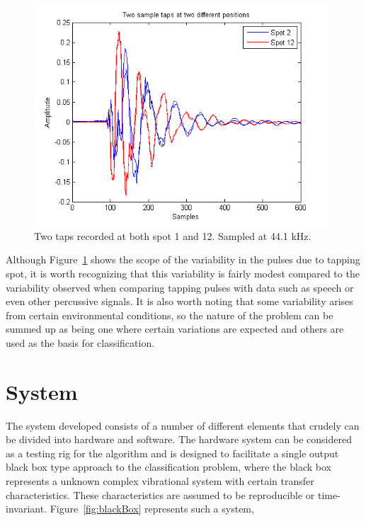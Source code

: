 \begin{figure}[!htbp]
  \begin{center}
    \includegraphics[width=110mm]{twotwoSampleTap}
    \caption{Two taps recorded at both spot 1 and 12. Sampled at 44.1 kHz.}\label{fig:twotwoSampleTap}
  \end{center}
\end{figure}


Although Figure~\ref{fig:twotwoSampleTap} shows the scope of the variability in the pulses due to tapping spot, it is worth recognizing that this variability is fairly modest compared to the variability observed when comparing tapping pulses with data such as speech or even other percussive signals. It is also worth noting that some variability arises from certain environmental conditions, so the nature of the problem can be summed up as being one where certain variations are expected and others are used as the basis for classification.

\section{System}\label{sec:APRsystem}
The system developed consists of a number of different elements that crudely can be divided into hardware and software. The hardware system can be considered as a testing rig for the algorithm and is designed to facilitate a single output black box type approach to the classification problem, where the black box represents a unknown complex vibrational system with certain transfer characteristics. These characteristics are assumed to be reproducible or time-invariant. Figure~\ref{fig:blackBox} represents such a system,

